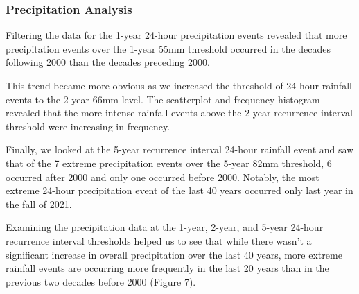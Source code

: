 \documentclass[
]{article}
\begin{document}
\newpage

\hypertarget{precipitation-analysis}{%
\subsubsection{\texorpdfstring{\textbf{Precipitation
Analysis}}{Precipitation Analysis}}\label{precipitation-analysis}}

Filtering the data for the 1-year 24-hour precipitation events revealed
that more precipitation events over the 1-year 55mm threshold occurred
in the decades following 2000 than the decades preceding 2000.

This trend became more obvious as we increased the threshold of 24-hour
rainfall events to the 2-year 66mm level. The scatterplot and frequency
histogram revealed that the more intense rainfall events above the
2-year recurrence interval threshold were increasing in frequency.

Finally, we looked at the 5-year recurrence interval 24-hour rainfall
event and saw that of the 7 extreme precipitation events over the 5-year
82mm threshold, 6 occurred after 2000 and only one occurred before 2000.
Notably, the most extreme 24-hour precipitation event of the last 40
years occurred only last year in the fall of 2021.

Examining the precipitation data at the 1-year, 2-year, and 5-year
24-hour recurrence interval thresholds helped us to see that while there
wasn't a significant increase in overall precipitation over the last 40
years, more extreme rainfall events are occurring more frequently in the
last 20 years than in the previous two decades before 2000 (Figure 7).
\end{document}
